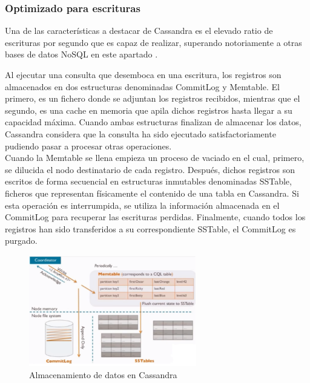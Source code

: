 \subsubsection{Optimizado para escrituras}

Una de las características a destacar de Cassandra es el elevado ratio de escrituras por segundo que es capaz de realizar, superando notoriamente a otras bases de datos NoSQL en este apartado \cite{rabl2012solving}.

Al ejecutar una consulta que desemboca en una escritura, los registros son almacenados en dos estructuras denominadas CommitLog y Memtable. El primero, es un fichero donde se adjuntan los registros recibidos, mientras que el segundo, es una cache en memoria que apila dichos registros hasta llegar a su capacidad máxima. Cuando ambas estructuras finalizan de almacenar los datos, Cassandra considera que la consulta ha sido ejecutado satisfactoriamente pudiendo pasar a procesar otras operaciones.\\

Cuando la Memtable se llena empieza un proceso de vaciado en el cual, primero, se dilucida el nodo destinatario de cada registro. Después, dichos registros son escritos de forma secuencial en estructuras inmutables denominadas SSTable, ficheros que representan físicamente el contenido de una tabla en Cassandra. Si esta operación es interrumpida, se utiliza la información almacenada en el CommitLog para recuperar las escrituras perdidas. Finalmente, cuando todos los registros han sido transferidos a su correspondiente SSTable, el CommitLog es purgado.\\

\begin{figure}[h]
	\centering
	\includegraphics[width=0.65\textwidth]{Ilustraciones/cassandra_data_storage.png}
	\caption{Almacenamiento de datos en Cassandra}
	\label{fig:almacenamiento_cassandra}
\end{figure}


